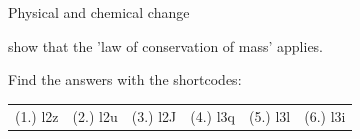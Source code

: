 \begin{eocexercises}{Physical and chemical change}
\begin{enumerate}[noitemsep, label=\textbf{\arabic*}. ]
show that the 'law of conservation of mass' applies.\newline
        \end{enumerate}
  \label{m38711**end}
  \label{324e353f2415b0f24a8077f8f18039bb**end}
\par {} Find the answers with the shortcodes:
 \par \begin{tabular}[h]{cccccc}
 (1.) l2z  &  (2.) l2u  &  (3.) l2J  &  (4.) l3q  &  (5.) l3l  &  (6.) l3i  & \end{tabular}
\end{eocexercises}

